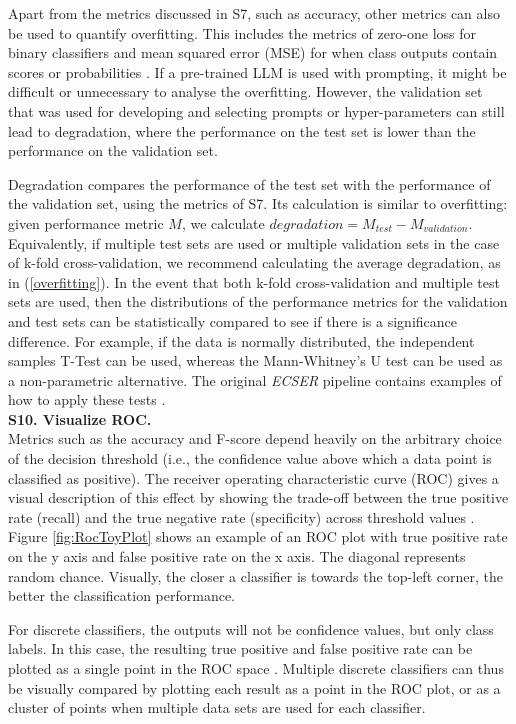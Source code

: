 \documentclass[a4paper]{article}
\begin{document}
Apart from the metrics discussed in S7, such as accuracy, other metrics can also be used to quantify overfitting. This includes the metrics of zero-one loss for binary classifiers and mean squared error (MSE) for when class outputs contain scores or probabilities \cite{Dellanna2022}. If a pre-trained LLM is used with prompting, it might be difficult or unnecessary to analyse the overfitting. However, the validation set that was used for developing and selecting prompts or hyper-parameters can still lead to degradation, where the performance on the test set is lower than the performance on the validation set.

Degradation compares the performance of the test set with the performance of the validation set, using the metrics of S7. Its calculation is similar to overfitting: given performance metric $M$, we calculate $degradation = M_{test} - M_{validation}$. Equivalently, if multiple test sets are used or multiple validation sets in the case of k-fold cross-validation, we recommend calculating the average degradation, as in (\ref{overfitting}). In the event that both k-fold cross-validation and multiple test sets are used, then the distributions of the performance metrics for the validation and test sets can be statistically compared to see if there is a significance difference. For example, if the data is normally distributed, the independent samples T-Test can be used, whereas the Mann-Whitney's U test can be used as a non-parametric alternative. The original \textit{ECSER} pipeline contains examples of how to apply these tests \cite{Dellanna2022}.\\

\textbf{S10. Visualize ROC.}\\
Metrics such as the accuracy and F-score depend heavily on the arbitrary choice of the decision threshold (i.e., the confidence value above which a data point is classified as positive). The receiver operating characteristic curve (ROC) gives a visual description of this effect by showing the trade-off between the true positive rate (recall) and the true negative rate (specificity) across threshold values \cite{metz1978roc}. Figure \ref{fig:RocToyPlot} shows an example of an ROC plot with true positive rate on the y axis and false positive rate on the x axis. The diagonal represents random chance. Visually, the closer a classifier is towards the top-left corner, the better the classification performance. 

For discrete classifiers, the outputs will not be confidence values, but only class labels. In this case, the resulting true positive and false positive rate can be plotted as a single point in the ROC space \cite{fawcett2006roc}. Multiple discrete classifiers can thus be visually compared by plotting each result as a point in the ROC plot, or as a cluster of points when multiple data sets are used for each classifier. 
\end{document}
